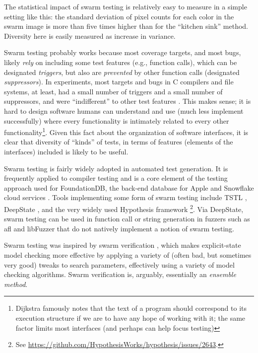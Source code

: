 \documentclass[sigplan]{acmart}
\begin{document}
The statistical impact of swarm testing is relatively easy to measure
in a simple setting like this: the standard deviation of pixel counts
for each color in the swarm image is more than five times higher than
for the ``kitchen sink'' method.  Diversity here is easily measured as
increase in variance.

Swarm testing probably works because most coverage targets, and most
bugs, likely \emph{rely} on including some test features (e.g.,
function calls), which can be designated \emph{triggers}, but also are
\emph{prevented} by other function calls (designated
\emph{suppressors}).  In experiments, most targets and bugs in C
compilers and file systems, at least, had a small number of triggers
and a small number of suppressors, and were ``indifferent'' to other
test features \cite{groce2013help}.  This makes sense; it is hard to
design software humans can understand and use (much less implement
successfully) where every
functionality is intimately related to every other functionality\footnote{Dijkstra famously \cite{ewd} notes that the text of a
program should correspond to its execution structure if we are to have
any hope of working with it; the same factor limits most interfaces
(and perhaps can help focus testing)}.
Given this fact about the organization of software interfaces, it is
clear that diversity of ``kinds'' of tests, in terms of features
(elements of the interfaces) included is likely to be useful.

Swarm testing is fairly widely adopted in automated test generation.  It is frequently
applied to compiler testing \cite{le2014compiler,dewey2015fuzzing} and
is a core element of the testing approach used for FoundationDB, the
back-end database for Apple and Snowflake cloud services
\cite{zhou2021foundationdb}.  Tools implementing some form of swarm
testing include TSTL \cite{tstlsttt}, DeepState \cite{goodman2018deepstate}, and the very widely used Hypothesis
framework \cite{hypothesis}\footnote{See \url{https://github.com/HypothesisWorks/hypothesis/issues/2643}.}.
Via DeepState, swarm testing can be used in function call or
string generation in fuzzers such as afl and libFuzzer that do not
natively implement a notion of swarm testing.

Swarm testing was inspired by swarm verification \cite{swarmIEEE},
which makes explicit-state model checking more effective by applying a
variety of (often bad, but sometimes very good) tweaks to search
parameters, effectively using a variety of model checking algorithms.
Swarm verification is, arguably, essentially an \emph{ensemble method}.
\end{document}
